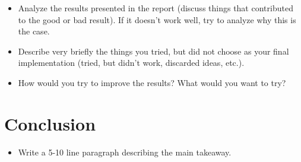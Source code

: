 \documentclass[a4, 10 pt, conference]{ieeeconf}  %
\begin{document}
{\color{blue}
\begin{itemize}
	\item Analyze the results presented in the report (discuss things that contributed to the good or bad result). If it doesn’t work well, try to analyze why this is the case.
	\item Describe very briefly the things you tried, but did not choose as your final implementation (tried, but didn’t work, discarded ideas, etc.).
	\item How would you try to improve the results? What would you want to try?
\end{itemize}
}

\section{Conclusion}
\label{sec:con}

{\color{blue}

	\begin{itemize}
		\item Write a 5-10 line paragraph describing the main takeaway.
	\end{itemize}

}

\end{document}
